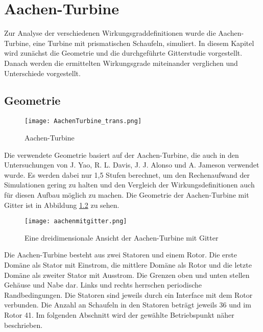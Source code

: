 \chapter{Aachen-Turbine}
\label{cha:aachen}
Zur Analyse der verschiedenen Wirkungsgraddefinitionen wurde die Aachen-Turbine, eine Turbine mit prismatischen Schaufeln, simuliert. In diesem Kapitel wird zunächst die Geometrie und die durchgeführte Gitterstudie vorgestellt. Danach werden die ermittelten Wirkungsgrade miteinander verglichen und Unterschiede vorgestellt.
\section{Geometrie}
\label{sec:aachengeo}
  \begin{figure}[htbp]
	\centering
	\texttt{[image: AachenTurbine\_trans.png]}
	\caption{Aachen-Turbine} \label{fig:imgAachenTurbine}
\end{figure} 
Die verwendete Geometrie basiert auf der Aachen-Turbine, die auch in den Untersuchungen von J. Yao, R. L. Davis, J. J. Alonso und A. Jameson\cite{ufi2001YaoDavis} 
verwendet wurde. Es werden dabei nur 1,5 Stufen berechnet, um den Rechenaufwand der Simulationen gering zu halten und den Vergleich der Wirkungsdefinitionen auch für diesen Aufbau möglich zu machen. Die Geometrie der Aachen-Turbine mit Gitter ist in Abbildung \ref{fig:aachengebiet} zu sehen. 
\begin{figure}[htbp]
	\centering
	\texttt{[image: aachenmitgitter.png]}
	\caption{Eine dreidimensionale Ansicht der Aachen-Turbine mit Gitter}
	\label{fig:aachengebiet}
\end{figure}
Die Aachen-Turbine besteht aus zwei Statoren und einem Rotor. Die erste Domäne als Stator mit Einstrom, die mittlere Domäne als Rotor und die letzte Domäne als zweiter Stator mit Ausstrom. Die Grenzen oben und unten stellen Gehäuse und Nabe dar. Links und rechts herrschen periodische Randbedingungen. Die Statoren sind jeweils durch ein Interface mit dem Rotor verbunden. Die Anzahl an Schaufeln in den Statoren beträgt jeweils 36 und im Rotor 41.
\newline
Im folgenden Abschnitt wird der gewählte Betriebspunkt näher beschrieben.
